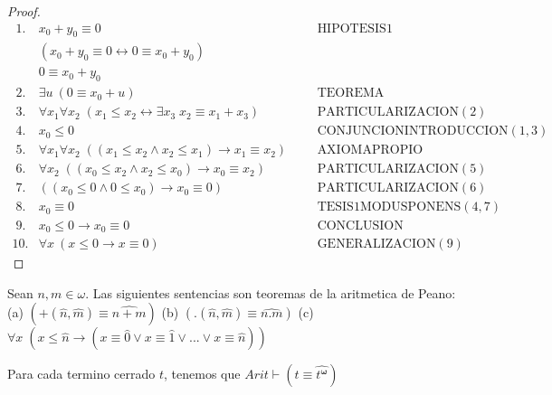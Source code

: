 \begin{proof}
    \(\displaystyle \begin{array}{lllll} \;1. & x_{0}+y_{0}\equiv 0 & & & \text{HIPOTESIS}1 \\ & (x_{0}+y_{0}\equiv 0\leftrightarrow 0\equiv x_{0}+y_{0}) & & & \\ & 0\equiv x_{0}+y_{0} & & & \\ \;2. & \exists u\ (0\equiv x_{0}+u) & & & \text{TEOREMA} \\ \;3. & \forall x_{1}\forall x_{2}\;(x_{1}\leq x_{2}\leftrightarrow \exists x_{3}\;x_{2}\equiv x_{1}+x_{3}) & & & \text{PARTICULARIZACION}(2) \\ \;4. & x_{0}\leq 0 & & & \text{CONJUNCIONINTRODUCCION}(1,3) \\ \;5. & \forall x_{1}\forall x_{2}\;((x_{1}\leq x_{2}\wedge x_{2}\leq x_{1})\rightarrow x_{1}\equiv x_{2}) & & & \text{AXIOMAPROPIO} \\ \;6. & \forall x_{2}\;((x_{0}\leq x_{2}\wedge x_{2}\leq x_{0})\rightarrow x_{0}\equiv x_{2}) & & & \text{PARTICULARIZACION}(5) \\ \;7. & ((x_{0}\leq 0\wedge 0\leq x_{0})\rightarrow x_{0}\equiv 0) & & & \text{PARTICULARIZACION}(6) \\ \;8. & x_{0}\equiv 0 & & & \text{TESIS}1\text{MODUSPONENS}(4,7) \\ \;9. & x_{0}\leq 0\rightarrow x_{0}\equiv 0 & & & \text{CONCLUSION} \\ 10. & \forall x\ (x\leq 0\rightarrow x\equiv 0) & & & \text{GENERALIZACION} (9) \end{array} \)
  \end{proof}

  \begin{lemma}
    Sean \(n,m\in \omega \). Las siguientes sentencias son teoremas de la aritmetica de Peano:
    (a) \((+(\widehat{n},\widehat{m})\equiv \widehat{n+m})\)
    (b) \((.(\widehat{n},\widehat{m})\equiv \widehat{n.m})\)
    (c) \(\forall x\;(x\leq \widehat{n}\rightarrow (x\equiv \widehat{0} \vee x\equiv \widehat{1}\vee ...\vee x\equiv \widehat{n}))\)
  \end{lemma}

  \begin{lemma}
    Para cada termino cerrado \(t\), tenemos que \(Arit\vdash (t\equiv \widehat{t^{ \mathbf{\omega }}})\)
  \end{lemma}

